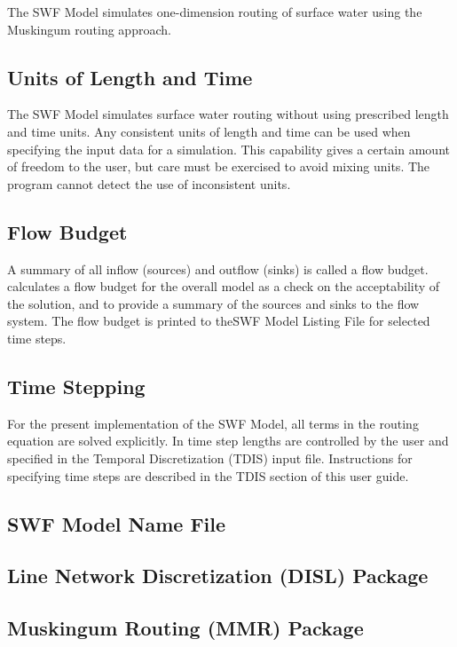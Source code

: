The SWF Model simulates one-dimension routing of surface water using the Muskingum routing approach.

\subsection{Units of Length and Time}
The SWF Model simulates surface water routing without using prescribed length and time units. Any consistent units of length and time can be used when specifying the input data for a simulation. This capability gives a certain amount of freedom to the user, but care must be exercised to avoid mixing units.  The program cannot detect the use of inconsistent units.

\subsection{Flow Budget}
A summary of all inflow (sources) and outflow (sinks) is called a flow budget.  \mf calculates a flow budget for the overall model as a check on the acceptability of the solution, and to provide a summary of the sources and sinks to the flow system.  The flow budget is printed to theSWF Model Listing File for selected time steps.

\subsection{Time Stepping}

For the present implementation of the SWF Model, all terms in the routing equation are solved explicitly.  In \mf time step lengths are controlled by the user and specified in the Temporal Discretization (TDIS) input file.  Instructions for specifying time steps are described in the TDIS section of this user guide.  

\newpage
\subsection{SWF Model Name File}


\newpage
\subsection{Line Network Discretization (DISL) Package}


\newpage
\subsection{Muskingum Routing (MMR) Package}


